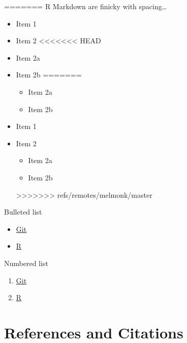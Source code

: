 \documentclass[12pt,]{article}
\begin{document}
\begin{itemize}
\itemsep1pt\parskip0pt
=======
R Markdown are finicky with spacing\ldots{}

\begin{itemize}
\tightlist
>>>>>>> refs/remotes/melmonk/master
\item
  Item 1
\item
  Item 2
<<<<<<< HEAD
\item
  Item 2a
\item
  Item 2b
=======

  \begin{itemize}
  \tightlist
  \item
    Item 2a
  \item
    Item 2b
  \end{itemize}
\item
  Item 1
\item
  Item 2

  \begin{itemize}
  \tightlist
  \item
    Item 2a
  \item
    Item 2b
  \end{itemize}
>>>>>>> refs/remotes/melmonk/master
\end{itemize}

Bulleted list

\begin{itemize}[noitemsep,nolistsep,topsep=0pt]

\item \href{https://git-scm.com/book/en/v2/Getting-Started-Installing-Git}{Git}

\item \href{https://cran.r-project.org/bin/windows/base/}{R}

\end{itemize}

Numbered list

\begin{enumerate}[noitemsep,nolistsep,topsep=0pt]

\item \href{https://git-scm.com/book/en/v2/Getting-Started-Installing-Git}{Git}

\item \href{https://cran.r-project.org/bin/windows/base/}{R} 

\end{enumerate}

\section{References and Citations}\label{references-and-citations}


\end{itemize}
\end{document}
